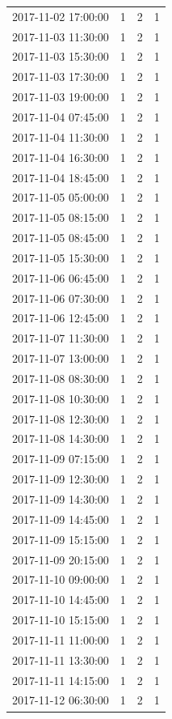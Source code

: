\begin{tabular}{lrrr}
2017-11-02 17:00:00 & 1 & 2 & 1 \\
2017-11-03 11:30:00 & 1 & 2 & 1 \\
2017-11-03 15:30:00 & 1 & 2 & 1 \\
2017-11-03 17:30:00 & 1 & 2 & 1 \\
2017-11-03 19:00:00 & 1 & 2 & 1 \\
2017-11-04 07:45:00 & 1 & 2 & 1 \\
2017-11-04 11:30:00 & 1 & 2 & 1 \\
2017-11-04 16:30:00 & 1 & 2 & 1 \\
2017-11-04 18:45:00 & 1 & 2 & 1 \\
2017-11-05 05:00:00 & 1 & 2 & 1 \\
2017-11-05 08:15:00 & 1 & 2 & 1 \\
2017-11-05 08:45:00 & 1 & 2 & 1 \\
2017-11-05 15:30:00 & 1 & 2 & 1 \\
2017-11-06 06:45:00 & 1 & 2 & 1 \\
2017-11-06 07:30:00 & 1 & 2 & 1 \\
2017-11-06 12:45:00 & 1 & 2 & 1 \\
2017-11-07 11:30:00 & 1 & 2 & 1 \\
2017-11-07 13:00:00 & 1 & 2 & 1 \\
2017-11-08 08:30:00 & 1 & 2 & 1 \\
2017-11-08 10:30:00 & 1 & 2 & 1 \\
2017-11-08 12:30:00 & 1 & 2 & 1 \\
2017-11-08 14:30:00 & 1 & 2 & 1 \\
2017-11-09 07:15:00 & 1 & 2 & 1 \\
2017-11-09 12:30:00 & 1 & 2 & 1 \\
2017-11-09 14:30:00 & 1 & 2 & 1 \\
2017-11-09 14:45:00 & 1 & 2 & 1 \\
2017-11-09 15:15:00 & 1 & 2 & 1 \\
2017-11-09 20:15:00 & 1 & 2 & 1 \\
2017-11-10 09:00:00 & 1 & 2 & 1 \\
2017-11-10 14:45:00 & 1 & 2 & 1 \\
2017-11-10 15:15:00 & 1 & 2 & 1 \\
2017-11-11 11:00:00 & 1 & 2 & 1 \\
2017-11-11 13:30:00 & 1 & 2 & 1 \\
2017-11-11 14:15:00 & 1 & 2 & 1 \\
2017-11-12 06:30:00 & 1 & 2 & 1 \\

\end{tabular}
